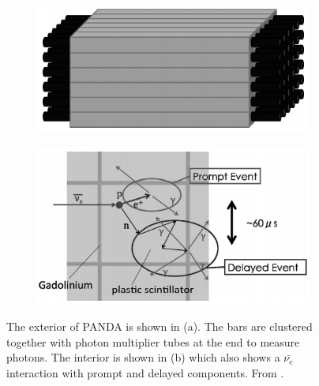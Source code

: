 \begin{figure}[!h]
\centering
\begin{subfigure}{.5\textwidth}
  \centering
  \includegraphics[width=\linewidth]{Chapter2/Figs/Raster/Panda_far.png}
  \captionsetup{width=.9\linewidth}
  \caption{}
  \label{subFig:pandaFar}
\end{subfigure}%
\begin{subfigure}{.5\textwidth}
  \centering
\includegraphics[width=\linewidth]{Chapter2/Figs/Raster/Panda_close.png}
  \captionsetup{width=.9\linewidth}
  \caption{}
  \label{subFig:pandaClose}
\end{subfigure}
\caption{The exterior of PANDA is shown in (a). The bars are clustered together with photon multiplier tubes at the end to measure photons. The interior is shown in (b) which also shows a  $\bar{\nu_e}$ interaction with prompt and delayed components. From \cite{PANDA_2014}.}
\label{fig:pandaCloseFar}
\end{figure}

